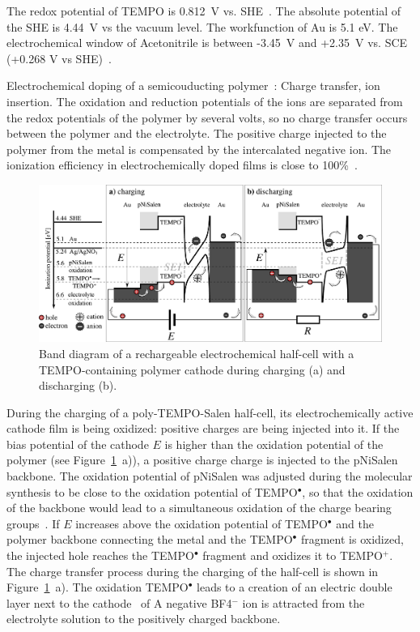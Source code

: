 The redox potential of TEMPO is 0.812~V vs. SHE~\cite{Zhou2020}.
The absolute potential of the SHE is 4.44~V vs the vacuum level.
The workfunction of Au is 5.1 eV.
The electrochemical window of Acetonitrile is between -3.45~V and +2.35~V vs. SCE (+0.268 V vs SHE)~\cite{Luca2015}.

Electrochemical doping of a semicouducting polymer~\cite{Jacobs2022}:
Charge transfer, ion insertion.
The oxidation and reduction potentials of the ions are separated from the redox potentials of the polymer by several volts, so no charge transfer occurs between the polymer and the electrolyte. The positive charge injected to the polymer from the metal is compensated by the intercalated negative ion. The ionization efficiency in electrochemically doped films is close to 100\%~\cite{Jacobs2022}.\\

\begin{figure}[h]
\center
	\includegraphics[width=1\textwidth]{./electrochemistry/figures/band_diagram.pdf}
	\caption{Band diagram of a rechargeable electrochemical half-cell with a TEMPO-containing polymer cathode during charging (a) and discharging (b).}
	\label{fig:band_diagram}
\end{figure}

\par
During the charging of a poly-TEMPO-Salen half-cell, its electrochemically active cathode film is being oxidized: positive charges are being injected into it. If the bias potential of the cathode $E$ is higher than the oxidation potential of the polymer (see Figure~\ref{fig:band_diagram}~a)), a positive charge charge is injected to the pNiSalen backbone. The oxidation potential of pNiSalen was adjusted during the molecular synthesis to be close to the oxidation potential of TEMPO$^{\bullet}$, so that the oxidation of the backbone would lead to a simultaneous oxidation of the charge bearing groups~\cite{Vereshchagin2020}. If $E$ increases above the oxidation potential of TEMPO$^{\bullet}$ and the polymer backbone connecting the metal and the TEMPO$^{\bullet}$ fragment is oxidized, the injected hole reaches the TEMPO$^{\bullet}$ fragment and oxidizes it to TEMPO$^+$. The charge transfer process during the charging of the half-cell is shown in Figure~\ref{fig:band_diagram}~a). The oxidation TEMPO$^{\bullet}$ leads to a creation of an electric double layer next to the cathode~\cite{Bhojane2022} of A negative BF4${^-}$ ion is attracted from the electrolyte solution to the positively charged backbone.\\


